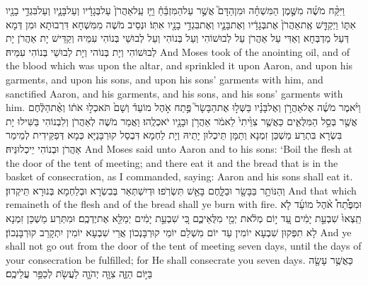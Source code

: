 {וַיִּקַּ֨ח מֹשֶׁ֜ה מִשֶּׁ֣מֶן הַמִּשְׁחָ֗ה וּמִן\maqqaf הַדָּם֮ אֲשֶׁ֣ר עַל\maqqaf הַמִּזְבֵּ֒חַ֒ וַיַּ֤ז עַֽל\maqqaf אַהֲרֹן֙ עַל\maqqaf בְּגָדָ֔יו וְעַל\maqqaf בָּנָ֛יו וְעַל\maqqaf בִּגְדֵ֥י בָנָ֖יו אִתּ֑וֹ וַיְקַדֵּ֤שׁ אֶֽת\maqqaf אַהֲרֹן֙ אֶת\maqqaf בְּגָדָ֔יו וְאֶת\maqqaf בָּנָ֛יו וְאֶת\maqqaf בִּגְדֵ֥י בָנָ֖יו אִתּֽוֹ׃}
{וּנְסֵיב מֹשֶׁה מִמִּשְׁחָא דִּרְבוּתָא וּמִן דְּמָא דְּעַל מַדְבְּחָא וְאַדִּי עַל אַהֲרֹן עַל לְבוּשׁוֹהִי וְעַל בְּנוֹהִי וְעַל לְבוּשֵׁי בְּנוֹהִי עִמֵּיהּ וְקַדֵּישׁ יָת אַהֲרֹן יָת לְבוּשׁוֹהִי וְיָת בְּנוֹהי וְיָת לְבוּשֵׁי בְּנוֹהִי עִמֵּיהּ׃}
{And Moses took of the anointing oil, and of the blood which was upon the altar, and sprinkled it upon Aaron, and upon his garments, and upon his sons, and upon his sons’ garments with him, and sanctified Aaron, and his garments, and his sons, and his sons’ garments with him.}{}
{וַיֹּ֨אמֶר מֹשֶׁ֜ה אֶל\maqqaf אַהֲרֹ֣ן וְאֶל\maqqaf בָּנָ֗יו בַּשְּׁל֣וּ אֶת\maqqaf הַבָּשָׂר֮ פֶּ֣תַח אֹ֣הֶל מוֹעֵד֒ וְשָׁם֙ תֹּאכְל֣וּ אֹת֔וֹ וְאֶ֨ת\maqqaf הַלֶּ֔חֶם אֲשֶׁ֖ר בְּסַ֣ל הַמִּלֻּאִ֑ים כַּאֲשֶׁ֤ר צִוֵּ֙יתִי֙ לֵאמֹ֔ר אַהֲרֹ֥ן וּבָנָ֖יו יֹאכְלֻֽהוּ׃}
{וַאֲמַר מֹשֶׁה לְאַהֲרֹן וְלִבְנוֹהִי בַּשִּׁילוּ יָת בִּשְׂרָא בִּתְרַע מַשְׁכַּן זִמְנָא וְתַמָּן תֵּיכְלוּן יָתֵיהּ וְיָת לַחְמָא דִּבְסַל קוּרְבָּנַיָּא כְּמָא דְּפַקֵּידִית לְמֵימַר אַהֲרֹן וּבְנוֹהִי יֵיכְלוּנֵּיהּ׃}
{And Moses said unto Aaron and to his sons: ‘Boil the flesh at the door of the tent of meeting; and there eat it and the bread that is in the basket of consecration, as I commanded, saying: Aaron and his sons shall eat it.}{}
{וְהַנּוֹתָ֥ר בַּבָּשָׂ֖ר וּבַלָּ֑חֶם בָּאֵ֖שׁ תִּשְׂרֹֽפוּ׃}
{וּדְיִשְׁתְּאַר בְּבִשְׂרָא וּבְלַחְמָא בְּנוּרָא תֵּיקְדוּן׃}
{And that which remaineth of the flesh and of the bread shall ye burn with fire.}{}
{וּמִפֶּ֩תַח֩ אֹ֨הֶל מוֹעֵ֜ד לֹ֤א תֵֽצְאוּ֙ שִׁבְעַ֣ת יָמִ֔ים עַ֚ד י֣וֹם מְלֹ֔את יְמֵ֖י מִלֻּאֵיכֶ֑ם כִּ֚י שִׁבְעַ֣ת יָמִ֔ים יְמַלֵּ֖א אֶת\maqqaf יֶדְכֶֽם׃}
{וּמִתְּרַע מַשְׁכַּן זִמְנָא לָא תִפְּקוּן שִׁבְעָא יוֹמִין עַד יוֹם מִשְׁלַם יוֹמֵי קוּרְבָּנְכוֹן אֲרֵי שִׁבְעָא יוֹמִין יִתְקָרַב קוּרְבָּנְכוֹן׃}
{And ye shall not go out from the door of the tent of meeting seven days, until the days of your consecration be fulfilled; for He shall consecrate you seven days.}{}
{כַּאֲשֶׁ֥ר עָשָׂ֖ה בַּיּ֣וֹם הַזֶּ֑ה צִוָּ֧ה יְהֹוָ֛ה לַעֲשֹׂ֖ת לְכַפֵּ֥ר עֲלֵיכֶֽם׃}
